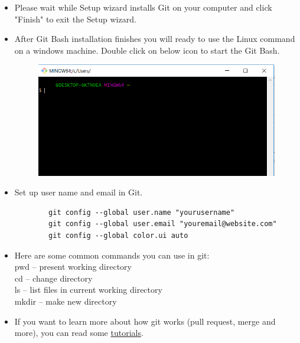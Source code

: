 \documentclass[11pt]{article} %
\begin{document}
\begin{itemize}
        \item Please wait while Setup wizard installs Git on your computer and click "Finish" to exit the Setup wizard. 
        \item After Git Bash installation finishes you will ready to use the Linux command on a windows machine. 
        Double click on below icon to start the Git Bash. 
        \begin{figure}[h!]
          \centering
          \includegraphics[width=0.7\linewidth]{figs/Launch-Git-Bash.png}
          \caption{}
          \label{fig:launchgitbash}
        \end{figure}
        \item Set up user name and email in Git. 
        \begin{lstlisting}
        git config --global user.name "yourusername"
        git config --global user.email "youremail@website.com"
        git config --global color.ui auto
        \end{lstlisting}
        \item Here are some common commands you can use in git:\\
        pwd -- present working directory\\
        cd -- change directory\\
        ls -- list files in current working directory\\
        mkdir -- make new directory\\
        \item If you want to learn more about how git works (pull request, merge and more), you can read some \href{https://www.atlassian.com/git}{tutorials}. 
        
      \end{itemize}
    
\end{document}
